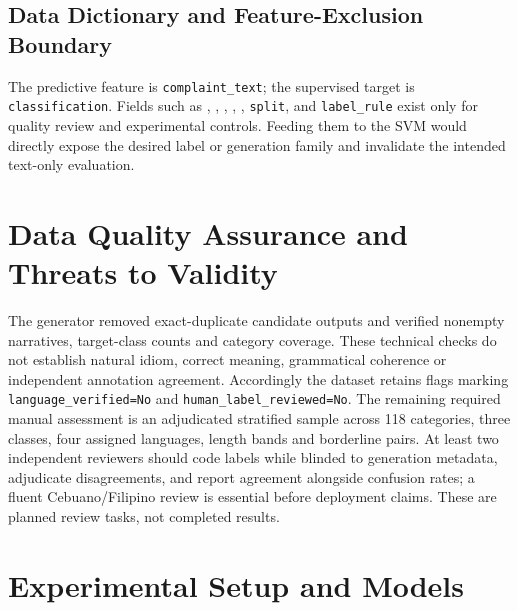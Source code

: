 \subsection{Data Dictionary and Feature-Exclusion Boundary}
The predictive feature is \texttt{complaint\_text}; the supervised target is \texttt{classification}. Fields such as , , , , , \texttt{split}, and \texttt{label\_rule} exist only for quality review and experimental controls. Feeding them to the SVM would directly expose the desired label or generation family and invalidate the intended text-only evaluation.

\section{Data Quality Assurance and Threats to Validity}
The generator removed exact-duplicate candidate outputs and verified nonempty narratives, target-class counts and category coverage. These technical checks do not establish natural idiom, correct meaning, grammatical coherence or independent annotation agreement. Accordingly the dataset retains flags marking \texttt{language\_verified=No} and \texttt{human\_label\_reviewed=No}. The remaining required manual assessment is an adjudicated stratified sample across 118 categories, three classes, four assigned languages, length bands and borderline pairs. At least two independent reviewers should code labels while blinded to generation metadata, adjudicate disagreements, and report agreement alongside confusion rates; a fluent Cebuano/Filipino review is essential before deployment claims. These are planned review tasks, not completed results.

\section{Experimental Setup and Models}

